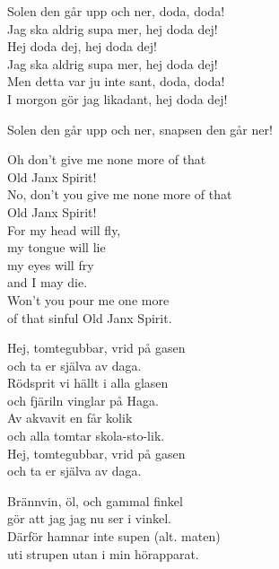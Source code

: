 \documentclass[a6paper,10pt]{article}
\begin{document}
\setlength{\oddsidemargin}{-0.37in}
\noindent
\begin{center}
\end{center}
Solen den går upp och ner, doda, doda! \\
Jag ska aldrig supa mer, hej doda dej! \\
Hej doda dej, hej doda dej! \\
Jag ska aldrig supa mer, hej doda dej! 
\vspace{5pt} \\
Men detta var ju inte sant, doda, doda! \\
I morgon gör jag likadant, hej doda dej! 
\vspace{10pt}
\begin{center}
\end{center}
Solen den går upp och ner, snapsen den går ner!
\vspace{25pt}
\begin{center}
\end{center}
Oh don't give me none more of that \\
Old Janx Spirit! \\
No, don't you give me none more of that \\
Old Janx Spirit! \\
For my head will fly, \\
my tongue will lie \\
my eyes will fry \\
and I may die. \\
Won't you pour me one more \\
of that sinful Old Janx Spirit. 

\newpage
\setlength{\oddsidemargin}{-0.47in}
\noindent
\begin{center}
\end{center}
Hej, tomtegubbar, vrid på gasen \\
och ta er själva av daga. \\
Rödsprit vi hällt i alla glasen \\
och fjäriln vinglar på Haga. \\
Av akvavit en får kolik \\
och alla tomtar skola-sto-lik. \\
Hej, tomtegubbar, vrid på gasen \\
och ta er själva av daga. 
\vspace{55pt}
\begin{center}
\end{center}
Brännvin, öl, och gammal finkel \\
gör att jag jag nu ser i vinkel. \\
Därför hamnar inte supen (alt. maten) \\
uti strupen utan i min hörapparat. \\
\end{document}
